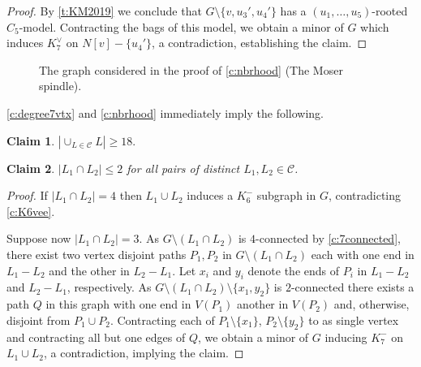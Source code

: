 \documentclass[reqno,final,12pt]{amsart}
\newtheorem{claim}{Claim}[section]
\newcommand{\mc}[1]{\mathcal{#1}}
\begin{document}
{\begin{proof}
By \cref{t:KM2019} we conclude that $G \setminus \{v,u_3',u_4'\}$ has a  $(u_1,\ldots,u_5)$-rooted $C_5$-model.  Contracting the bags of this model, we obtain a minor of $G$ which induces $K^{\vee}_7$ on $N[v] - \{u_4'\}$, a contradiction, establishing the claim.
\end{proof}
\begin{figure}[h]
	\centering
\caption{ The graph considered in the proof of \cref{c:nbrhood} (The Moser spindle).}
\label{fig:inflationsC5}
\end{figure}

\cref{c:degree7vtx} and \cref{c:nbrhood} immediately imply the following.

\begin{claim}\label{c:cliqueunion}  $|\cup_{L \in \mc{C}} L| \geq 18.$ 
	\end{claim}
	

\begin{claim}\label{c:clique1}  $|L_1 \cap L_2| \leq 2$ for all pairs of distinct $L_1,L_2 \in \mc{C}$. 
\end{claim}	
\begin{proof} 
If $|L_1 \cap L_2|=4$ then $L_1 \cup L_2$ induces a $K_6^-$ subgraph in $G$, contradicting  \cref{c:K6vee}. 

Suppose now $|L_1 \cap L_2|=3$. As $G \setminus (L_1 \cap L_2)$ is $4$-connected by \cref{c:7connected}, there exist two vertex disjoint paths $P_1,P_2$ in  $G \setminus (L_1 \cap L_2)$  each with one end in $L_1 - L_2$ and the other in $L_2 - L_1$. Let $x_i$ and $y_i$ denote the ends of $P_i$ in  $L_1 - L_2$  and  $L_2 - L_1$, respectively. As $G \setminus (L_1 \cap L_2) \setminus \{x_1,y_2\}$ is $2$-connected there exists a path $Q$ in this graph with one end in $V(P_1)$ another in $V(P_2)$ and, otherwise, disjoint from $P_1 \cup P_2$. Contracting each of  $P_1 \setminus \{x_1\}$,  $P_2 \setminus \{y_2\}$ to as single vertex and contracting all but one edges of $Q$, we obtain a minor of $G$ inducing $K_7^-$ on $L_1 \cup L_2$, a contradiction, implying the claim.
\end{proof}

}
\end{document}
